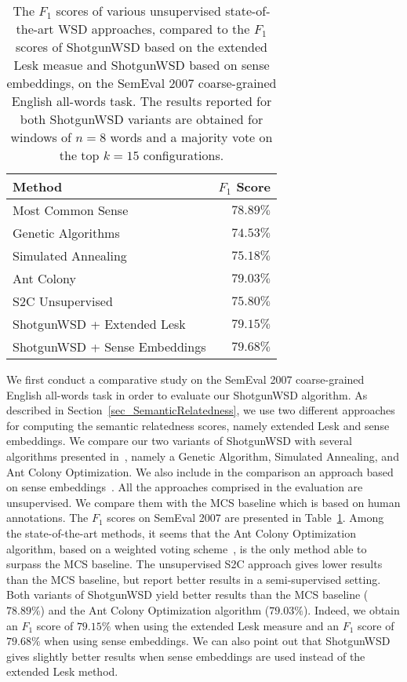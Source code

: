 \documentclass[11pt]{article}
\begin{document}
\begin{table}[h]
\small{
\begin{center}
\begin{tabular}{|l|r|}
\hline
Method 																										& $F_1$ Score\\
\hline
Most Common Sense																					& $78.89\%$\\
Genetic Algorithms~\cite{Schwab-WET-2013} 											& $74.53\%$\\
Simulated Annealing~\cite{Schwab-WET-2013} 											& $75.18\%$\\
Ant Colony~\cite{Schwab-WET-2013} 														& $79.03\%$\\
S2C Unsupervised~\cite{Chen-EMNLP-2014}												& $75.80\%$\\
\hline
ShotgunWSD + Extended Lesk																		& $79.15\%$\\
ShotgunWSD + Sense Embeddings																& $79.68\%$\\
\hline
\end{tabular}
\end{center}
\caption{\label{tab_SemEval2007_Results} The $F_1$ scores of various unsupervised state-of-the-art WSD approaches, compared to the $F_1$ scores of ShotgunWSD based on the extended Lesk measue and ShotgunWSD based on sense embeddings, on the SemEval 2007 coarse-grained English all-words task. The results reported for both ShotgunWSD variants are obtained for windows of $n=8$ words and a majority vote on the top $k=15$ configurations.}
}
\end{table}

We first conduct a comparative study on the SemEval 2007 coarse-grained English all-words task in order to evaluate our ShotgunWSD algorithm. As described in Section~\ref{sec_SemanticRelatedness}, we use two different approaches for computing the semantic relatedness scores, namely extended Lesk and sense embeddings. We compare our two variants of ShotgunWSD with several algorithms presented in~\cite{Schwab-COLING-2012,Schwab-WET-2013}, namely a Genetic Algorithm, Simulated Annealing, and Ant Colony Optimization. We also include in the comparison an approach based on sense embeddings~\cite{Chen-EMNLP-2014}. All the approaches comprised in the evaluation are unsupervised. We compare them with the MCS baseline which is based on human annotations. The $F_1$ scores on SemEval 2007 are presented in Table~\ref{tab_SemEval2007_Results}. Among the state-of-the-art methods, it seems that the Ant Colony Optimization algorithm, based on a weighted voting scheme~\cite{Schwab-WET-2013}, is the only method able to surpass the MCS baseline. The unsupervised S2C approach gives lower results than the MCS baseline, but  report better results in a semi-supervised setting. Both variants of ShotgunWSD yield better results than the MCS baseline ($78.89\%$) and the Ant Colony Optimization algorithm ($79.03\%$). Indeed, we obtain an $F_1$ score of $79.15\%$ when using the extended Lesk measure and an $F_1$ score of $79.68\%$ when using sense embeddings. We can also point out that ShotgunWSD gives slightly better results when sense embeddings are used instead of the extended Lesk method.
\end{document}

